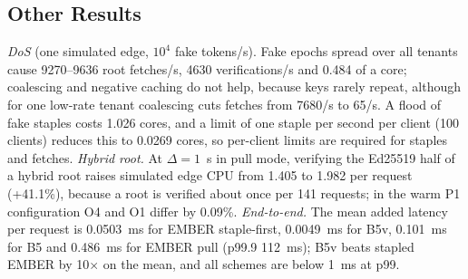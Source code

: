 \subsection{Other Results}
\label{sec:res-other}
\emph{DoS} (one simulated edge, $10^4$ fake tokens/s). Fake epochs spread over all tenants cause \num{9270}--\num{9636} root fetches/s, \num{4630} verifications/s and 0.484 of a core; coalescing and negative caching do not help, because keys rarely repeat, although for one low-rate tenant coalescing cuts fetches from \num{7680}/s to 65/s. A flood of fake staples costs 1.026 cores, and a limit of one staple per second per client (100 clients) reduces this to 0.0269 cores, so per-client limits are required for staples and fetches. \emph{Hybrid root.} At $\Delta=1$~s in pull mode, verifying the Ed25519 half of a hybrid root raises simulated edge CPU from 1.405 to 1.982\us{} per request (+41.1\%), because a root is verified about once per 141 requests; in the warm P1 configuration O4 and O1 differ by 0.09\%. \emph{End-to-end.} The mean added latency per request is 0.0503~ms for EMBER staple-first, 0.0049~ms for B5v, 0.101~ms for B5 and 0.486~ms for EMBER pull (p99.9 112~ms); B5v beats stapled EMBER by 10$\times$ on the mean, and all schemes are below 1~ms at p99.
